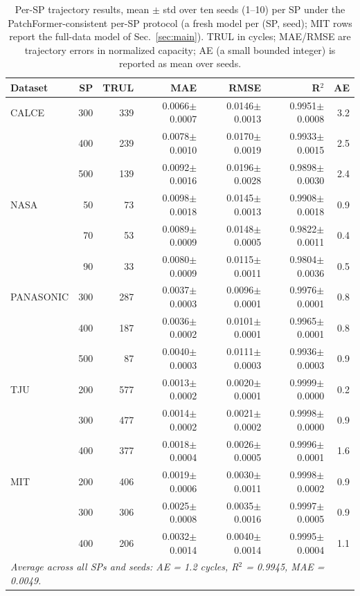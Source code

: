 \begin{table}[htbp]
\centering
\caption{Per-SP trajectory results, mean $\pm$ std
over ten seeds (1--10) per SP under the PatchFormer-consistent
per-SP protocol (a fresh model per (SP, seed); MIT rows report
the full-data model of Sec.~\ref{sec:main}). TRUL in cycles; MAE/RMSE are trajectory
errors in normalized capacity; AE (a small bounded integer) is
reported as mean over seeds.}
\label{tab:tableA}
\scriptsize
\setlength{\tabcolsep}{3pt}
\begin{tabular}{lr rrrrr}
\toprule
Dataset & SP & TRUL & MAE & RMSE & R$^2$ & AE \\
\midrule
CALCE & 300 & 339 & 0.0066$\pm$0.0007 & 0.0146$\pm$0.0013 & 0.9951$\pm$0.0008 & 3.2 \\
  & 400 & 239 & 0.0078$\pm$0.0010 & 0.0170$\pm$0.0019 & 0.9933$\pm$0.0015 & 2.5 \\
  & 500 & 139 & 0.0092$\pm$0.0016 & 0.0196$\pm$0.0028 & 0.9898$\pm$0.0030 & 2.4 \\
NASA & 50 & 73 & 0.0098$\pm$0.0018 & 0.0145$\pm$0.0013 & 0.9908$\pm$0.0018 & 0.9 \\
  & 70 & 53 & 0.0089$\pm$0.0009 & 0.0148$\pm$0.0005 & 0.9822$\pm$0.0011 & 0.4 \\
  & 90 & 33 & 0.0080$\pm$0.0009 & 0.0115$\pm$0.0011 & 0.9804$\pm$0.0036 & 0.5 \\
PANASONIC & 300 & 287 & 0.0037$\pm$0.0003 & 0.0096$\pm$0.0001 & 0.9976$\pm$0.0001 & 0.8 \\
  & 400 & 187 & 0.0036$\pm$0.0002 & 0.0101$\pm$0.0001 & 0.9965$\pm$0.0001 & 0.8 \\
  & 500 & 87 & 0.0040$\pm$0.0003 & 0.0111$\pm$0.0003 & 0.9936$\pm$0.0003 & 0.9 \\
TJU & 200 & 577 & 0.0013$\pm$0.0002 & 0.0020$\pm$0.0001 & 0.9999$\pm$0.0000 & 0.2 \\
  & 300 & 477 & 0.0014$\pm$0.0002 & 0.0021$\pm$0.0002 & 0.9998$\pm$0.0000 & 0.9 \\
  & 400 & 377 & 0.0018$\pm$0.0004 & 0.0026$\pm$0.0005 & 0.9996$\pm$0.0001 & 1.6 \\
MIT & 200 & 406 & 0.0019$\pm$0.0006 & 0.0030$\pm$0.0011 & 0.9998$\pm$0.0002 & 0.9 \\
  & 300 & 306 & 0.0025$\pm$0.0008 & 0.0035$\pm$0.0016 & 0.9997$\pm$0.0005 & 0.9 \\
  & 400 & 206 & 0.0032$\pm$0.0014 & 0.0040$\pm$0.0014 & 0.9995$\pm$0.0004 & 1.1 \\
\midrule
\multicolumn{7}{l}{\emph{Average across all SPs and seeds: AE = 1.2 cycles, R$^2$ = 0.9945, MAE = 0.0049.}} \\
\bottomrule
\end{tabular}
\end{table}

